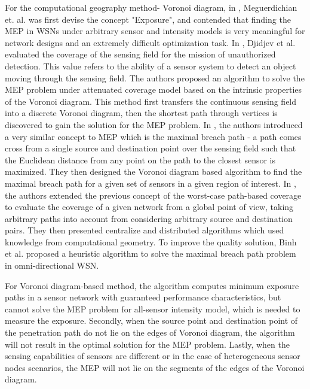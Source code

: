 \documentclass[final]{elsarticle}
\begin{document}
For the computational geography method- Voronoi diagram, in \cite{meguerdichian2001exposure}, Meguerdichian et. al. was first devise the concept "Exposure", and contended that finding the MEP in WSNs under arbitrary sensor and intensity models is very meaningful for network designs and an extremely difficult optimization task. In \cite{djidjev2010approximation}, Djidjev et al. evaluated the coverage of the sensing field for the mission of unauthorized detection. This value refers to the ability of a sensor system to detect an object moving through the sensing field. The authors proposed an algorithm to solve the MEP problem under attenuated coverage model based on the intrinsic properties of the Voronoi diagram. This method first transfers the continuous sensing field into a discrete Voronoi diagram, then the shortest path through vertices is discovered to gain the solution for the MEP problem. In \cite{megerian2005worst}, the authors introduced a very similar concept to MEP which is the maximal breach path - a path comes cross from a single source and destination point over the sensing field such that the Euclidean distance from any point on the path to the closest sensor is maximized. They then designed the Voronoi diagram based algorithm to find the maximal breach path for a given set of sensors in a given region of interest. In \cite{lee2013best}, the authors  extended the previous concept of the worst-case path-based coverage to evaluate the coverage of a given network from a global point of view, taking arbitrary paths into account from considering arbitrary source and destination pairs. They then presented centralize and distributed algorithms which used knowledge from computational geometry. To improve the quality solution, Binh et al. \cite{binh2016heuristic} proposed a heuristic algorithm to solve the maximal breach path problem in omni-directional WSN.

For Voronoi diagram-based method, the algorithm computes minimum exposure paths in a sensor network with guaranteed performance characteristics, but cannot solve the MEP problem for all-sensor intensity model, which is needed to measure the exposure. Secondly,
when the source point and destination point of the penetration
path do not lie on the edges of Voronoi diagram, the algorithm
will not result in the optimal solution for the MEP problem. Lastly,
when the sensing capabilities of sensors are different or in the case of heterogeneous sensor nodes scenarios, the MEP will not lie on the segments of the edges of the Voronoi diagram.
\end{document}
